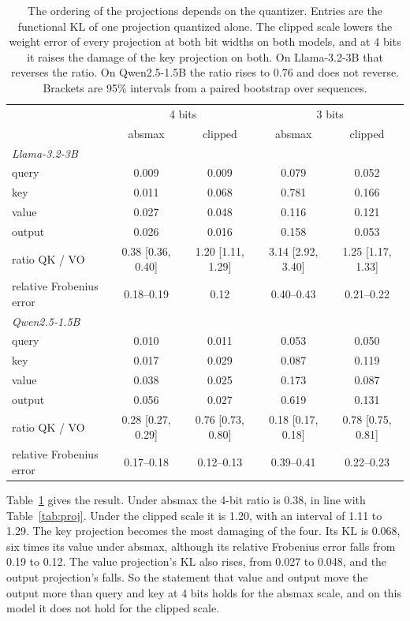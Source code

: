 \documentclass[journal]{IEEEtran}
\newcommand{\KL}{\mathrm{KL}}
\begin{document}
\begin{table}[t]
\centering
\caption{The ordering of the projections depends on the quantizer. Entries are the functional
$\KL$ of one projection quantized alone. The clipped scale lowers the weight
error of every projection at both bit widths on both models, and at 4 bits it raises the damage
of the key projection on both. On Llama-3.2-3B that reverses the ratio. On Qwen2.5-1.5B the ratio
rises to 0.76 and does not reverse. Brackets
are 95\% intervals from a paired bootstrap over sequences.}
\label{tab:quant}
\small
\begin{tabular}{lcccc}
\toprule
 & \multicolumn{2}{c}{4 bits} & \multicolumn{2}{c}{3 bits} \\
 & absmax & clipped & absmax & clipped \\
\midrule
\multicolumn{5}{l}{\emph{Llama-3.2-3B}} \\
query & 0.009 & 0.009 & 0.079 & 0.052 \\
key & 0.011 & 0.068 & 0.781 & 0.166 \\
value & 0.027 & 0.048 & 0.116 & 0.121 \\
output & 0.026 & 0.016 & 0.158 & 0.053 \\
ratio QK / VO & 0.38 [0.36, 0.40] & 1.20 [1.11, 1.29] & 3.14 [2.92, 3.40] & 1.25 [1.17, 1.33] \\
relative Frobenius error & 0.18--0.19 & 0.12 & 0.40--0.43 & 0.21--0.22 \\
\midrule
\multicolumn{5}{l}{\emph{Qwen2.5-1.5B}} \\
query & 0.010 & 0.011 & 0.053 & 0.050 \\
key & 0.017 & 0.029 & 0.087 & 0.119 \\
value & 0.038 & 0.025 & 0.173 & 0.087 \\
output & 0.056 & 0.027 & 0.619 & 0.131 \\
ratio QK / VO & 0.28 [0.27, 0.29] & 0.76 [0.73, 0.80] & 0.18 [0.17, 0.18] & 0.78 [0.75, 0.81] \\
relative Frobenius error & 0.17--0.18 & 0.12--0.13 & 0.39--0.41 & 0.22--0.23 \\
\bottomrule
\end{tabular}
\end{table}

Table~\ref{tab:quant} gives the result. Under absmax the 4-bit ratio is 0.38, in line with
Table~\ref{tab:proj}. Under the clipped scale it is 1.20, with an interval of 1.11 to 1.29. The
key projection becomes the most damaging of the four. Its $\KL$ is 0.068, six times its value
under absmax, although its relative Frobenius error falls from 0.19 to 0.12. The value
projection's $\KL$ also rises, from 0.027 to 0.048, and the output projection's falls. So the
statement that value and output move the output more than query and key at 4 bits holds for the
absmax scale, and on this model it does not hold for the clipped scale.
\end{document}

